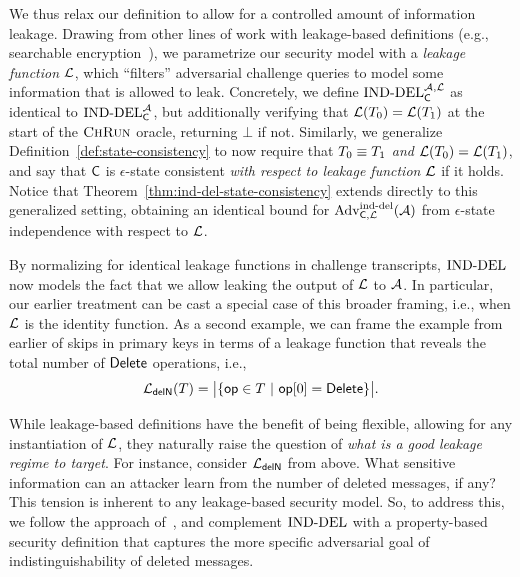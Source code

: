 We thus relax our definition to allow for a controlled amount of information leakage. Drawing from other lines of work with leakage-based definitions (e.g., searchable encryption~\cite{}),
we parametrize our security model with a \emph{leakage function} $\mathcal{L}$, which ``filters'' adversarial challenge queries to model some information that is allowed to leak. Concretely, we define $\textnormal{IND-DEL}_{\mathsf{C}}^{\mathcal{A}, \mathcal{L}}$ as identical to $\textnormal{IND-DEL}_{\mathsf{C}}^{\mathcal{A}}$, but additionally verifying that $\mathcal{L}(T_0) = \mathcal{L}(T_1)$ at the start of the $\textup{\textsc{ChRun}}$ oracle, returning $\bot$ if not. Similarly, we generalize Definition~\ref{def:state-consistency} to now require that $T_0 \equiv T_1$ \emph{and} $\mathcal{L}(T_0) = \mathcal{L}(T_1)$, and say that $\mathsf{C}$ is $\epsilon$-state consistent \emph{with respect to leakage function $\mathcal{L}$} if it holds. Notice that Theorem~\ref{thm:ind-del-state-consistency} extends directly to this generalized setting, obtaining an identical bound for $\textnormal{Adv}^{\textup{ind-del}}_{\mathsf{C}, \mathcal{L}}(\mathcal{A})$ from $\epsilon$-state independence with respect to $\mathcal{L}$.

By normalizing for identical leakage functions in challenge transcripts, $\textnormal{IND-DEL}$ now models the fact that we allow leaking the output of $\mathcal{L}$ to $\mathcal{A}$. In particular, our earlier treatment can be cast a special case of this broader framing, i.e., when $\mathcal{L}$ is the identity function. As a second example, we can frame the example from earlier of skips in primary keys in terms of a leakage function that reveals the total number of $\mathsf{Delete}$ operations, i.e., \[\leakageDelNum(\transcript) = \big|\{\textsf{op} \in \transcript\ |\ \textsf{op}[0]=\Delete\}\big|.\]

While leakage-based definitions have the benefit of being flexible, allowing for any instantiation of $\mathcal{L}$, they naturally raise the question of \emph{what is a good leakage regime to target}. For instance, consider $\mathcal{L}_\textsf{delN}$ from above. What sensitive information can an attacker learn from the number of deleted messages, if any? This tension is inherent to any leakage-based security model. So, to address this, we follow the approach of~\cite{tyagi2018burnbox}, and complement $\textnormal{IND-DEL}$ with a property-based security definition that captures the more specific adversarial goal of indistinguishability of deleted messages. 

